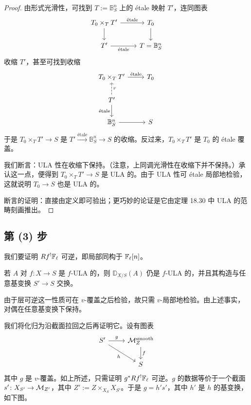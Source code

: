 \begin{proof}
由形式光滑性，可找到 $T:=\mathbb{B}^n_S$ 上的 étale 映射 $T'$，连同图表
\[
\begin{tikzcd}
T_0\times_T T' \arrow[r, "\text{étale}"] \arrow[d] & T_0 \arrow[d] \\
T' \arrow[r, "\text{étale}"'] & T=\mathbb{B}^n_S
\end{tikzcd}
\]
收缩 $T'$，甚至可找到收缩
\[
\begin{tikzcd}
T_0\times_T T' \arrow[r, "\text{étale}"] & T_0 \\
T' \arrow[u, dashed, "r"'] \arrow[d, "\text{étale}"'] & \\
\mathbb{B}^n_S \arrow[r] & S
\end{tikzcd}
\]
于是 $T_0\times_T T'\to S$ 是 $T'\xrightarrow{\text{étale}}\mathbb{B}^n_S\to S$ 的收缩。反过来，$T_0\times_T T'$ 是 $T_0$ 的 étale 覆盖。

我们断言：ULA 性在收缩下保持。（注意，上同调光滑性在收缩下并不保持。）承认这一点，便得到 $T_0\times_T T'\to S$ 是 ULA 的。由于 ULA 性可 étale 局部地检验，这就说明 $T_0\to S$ 也是 ULA 的。

断言的证明：直接由定义即可验出；更巧妙的论证是它由定理 18.30 中 ULA 的范畴刻画推出。
\end{proof}

\subsection{第 (3) 步}

我们要证明 $Rf^!\mathbb{F}_\ell$ 可逆，即局部同构于 $\mathbb{F}_\ell[n]$。

\begin{fact}
若 $A$ 对 $f\colon X\to S$ 是 $f$-ULA 的，则 $\mathbb{D}_{X/S}(A)$ 仍是 $f$-ULA 的，并且其构造与任意基变换 $S'\to S$ 交换。
\end{fact}

由于层可逆这一性质可在 $v$-覆盖之后检验，故只需 $v$-局部地检验。由上述事实，对偶在任意基变换下保持。


我们将化归为沿截面拉回之后再证明它。设有图表
\[
\begin{tikzcd}
S' \arrow[r, "g"] \arrow[dr, "h"'] & \cM_Z^{\mathrm{smooth}} \arrow[d, "f"] \\
& S
\end{tikzcd}
\]
其中 $g$ 是 $v$-覆盖。如上所述，只需证明 $g^*Rf^!\mathbb{F}_\ell$ 可逆。$g$ 的数据等价于一个截面 $s'\colon X_{S'}\to\mathcal{M}_{Z'}$，其中 $Z':=Z\times_{X_S}X_{S'}$。于是 $g=h's'$，其中 $h'$ 是 $h$ 的基变换，如下图。

